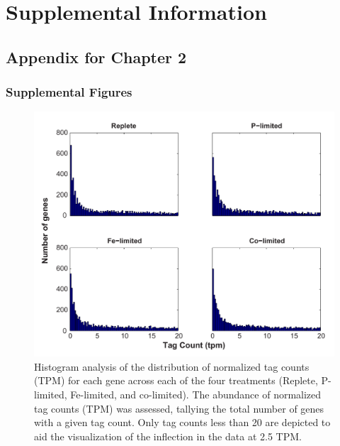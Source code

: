\chapter{Supplemental Information}

\raggedbottom




\clearpage
\section{Appendix for Chapter 2}
\subsection{Supplemental Figures}
\begin{figure}[h!]
  \centering
    \includegraphics[width=1\textwidth]{Images/C2_FigureS1_v6.pdf}
    \caption[Distribution of normalized tag counts across treatments]{Histogram analysis of the distribution of normalized tag counts (TPM) for each gene across each of the four treatments (Replete, P-limited, Fe-limited, and co-limited). The abundance of normalized tag counts (TPM) was assessed, tallying the total number of genes with a given tag count. Only tag counts less than 20 are depicted to aid the visualization of the inflection in the data at 2.5 TPM.}
  \label{fig:a1f1}
\end{figure}

